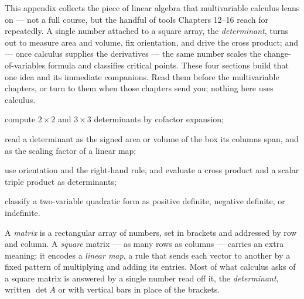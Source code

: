 \documentclass[a4paper,12pt,oneside]{memoir}
\begin{document}
\begin{lead}
This appendix collects the piece of linear algebra that multivariable calculus leans on — not a full course, but the handful of tools Chapters 12–16 reach for repeatedly. A single number attached to a square array, the \emph{determinant}, turns out to measure area and volume, fix orientation, and drive the cross product; and — once calculus supplies the derivatives — the same number scales the change-of-variables formula and classifies critical points. These four sections build that one idea and its immediate companions. Read them before the multivariable chapters, or turn to them when those chapters send you; nothing here uses calculus.
\end{lead}
\begin{objectives}
  \item compute \(2\times 2\) and \(3\times 3\) determinants by cofactor expansion;
  \item read a determinant as the signed area or volume of the box its columns span, and as the scaling factor of a linear map;
  \item use orientation and the right-hand rule, and evaluate a cross product and a scalar triple product as determinants;
  \item classify a two-variable quadratic form as positive definite, negative definite, or indefinite.
\end{objectives}
A \emph{matrix} is a rectangular array of numbers, set in brackets and addressed by row and column. A \emph{square} matrix — as many rows as columns — carries an extra meaning: it encodes a \emph{linear map}, a rule that sends each vector to another by a fixed pattern of multiplying and adding its entries. Most of what calculus asks of a square matrix is answered by a single number read off it, the \emph{determinant}, written \(\det A\) or with vertical bars in place of the brackets.
\end{document}
